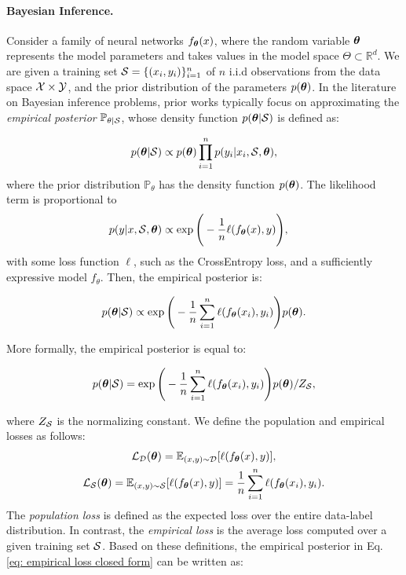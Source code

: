 \paragraph{Bayesian Inference.} Consider a family of neural networks $f_{\bm{\theta}}(x)$, where the random variable ${\bm{\theta}}$ represents the model parameters and takes values in the model space $\Theta \subset \mathbb{R}^d$. We are given a training set ${\mathcal{S}} = \{(x_i, y_i)\}_{i = 1}^n$ of $n$ i.i.d observations from the data space ${\mathcal{X}} \times {\mathcal{Y}}$, and the prior distribution of the parameters $p({\bm{\theta}})$. In the literature on Bayesian inference problems, prior works typically focus on approximating the \textit{empirical posterior} $\mathbb{P}_{\theta|{\mathcal{S}}}$, whose density function $p({\bm{\theta}} |{\mathcal{S}})$ is defined as:

\begin{equation*}
    p({\bm{\theta}} | {\mathcal{S}}) \propto p({\bm{\theta}})\prod_{i=1}^n p(y_i|x_i, {\mathcal{S}}, {\bm{\theta}}),
\end{equation*}
where the prior distribution $\mathbb{P}_\theta$ has the density function $p({\bm{\theta}})$. The likelihood term is proportional to
\begin{align*}
    p(y|x, {\mathcal{S}}, {\bm{\theta}}) &\propto \exp \Bigg(-\frac{1}{n}\ell(f_{\bm{\theta}}(x), y) \Bigg),
\end{align*}
with some loss function $\ell$, such as the CrossEntropy loss, and a sufficiently expressive model $f_\theta$. Then, the empirical posterior is:

\begin{equation}
\label{eq: empirical loss}
    p({\bm{\theta}}| {\mathcal{S}}) \propto \exp \Bigg(-\frac{1}{n} \sum_{i=1}^n\ell(f_{\bm{\theta}}(x_i), y_i)\Bigg)p({\bm{\theta}}).
\end{equation}

More formally, the empirical posterior is equal to:

\begin{equation}
\label{eq: empirical loss closed form}
    p({\bm{\theta}}| {\mathcal{S}}) = \exp \Bigg(-\frac{1}{n} \sum_{i=1}^n\ell(f_{\bm{\theta}}(x_i), y_i)\Bigg)p({\bm{\theta}})/Z_{{\mathcal{S}}},
\end{equation}

where $Z_{\mathcal{S}}$ is the normalizing constant. We define the population and empirical losses as follows:
\begin{gather*}
    {\mathcal{L}}_{\mathcal{D}}({\bm{\theta}}) = \mathbb{E}_{(x, y) \sim {\mathcal{D}}}[\ell(f_{\bm{\theta}}(x), y)], \\
    {\mathcal{L}}_{\mathcal{S}}({\bm{\theta}}) = \mathbb{E}_{(x, y) \sim {\mathcal{S}}}[\ell(f_{\bm{\theta}}(x), y)]=\frac{1}{n}\sum_{i=1}^n \ell(f_{\bm{\theta}}(x_i), y_i).
\end{gather*}
The \textit{population loss} is defined as the expected loss over the entire data-label distribution. In contrast, the \textit{empirical loss} is the average loss computed over a given training set ${\mathcal{S}}$. Based on these definitions, the empirical posterior in Eq. \ref{eq: empirical loss closed form} can be written as:


